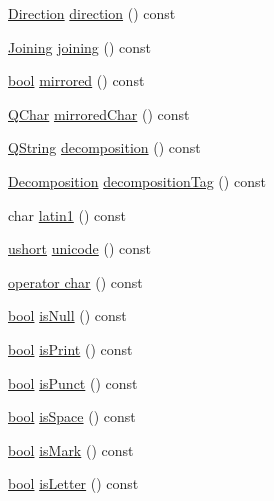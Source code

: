 \begin{DoxyCompactItemize}
\item 
\hyperlink{class_q_char_a54978126be7630b3e85394325a822302}{Direction} \hyperlink{class_q_char_a19463f6223338af13ffb5ec8231d0bed}{direction} () const 
\item 
\hyperlink{class_q_char_a086edd55a90ad2cf910ca3ab5fbe7bde}{Joining} \hyperlink{class_q_char_a8e2f3e25a839b13c9fe80cd3aa680273}{joining} () const 
\item 
\hyperlink{qglobal_8h_a1062901a7428fdd9c7f180f5e01ea056}{bool} \hyperlink{class_q_char_a1d8c62f3c5a7fdbc0fbd2446f2c4f14b}{mirrored} () const 
\item 
\hyperlink{class_q_char}{Q\+Char} \hyperlink{class_q_char_aa09f213821d383228dd0cd493e9fdc47}{mirrored\+Char} () const 
\item 
\hyperlink{class_q_string}{Q\+String} \hyperlink{class_q_char_a275c2ad60e7096c7528c21569a033c2b}{decomposition} () const 
\item 
\hyperlink{class_q_char_a13be45046e82a6d2991cef0b7c18d522}{Decomposition} \hyperlink{class_q_char_a67061033f813f4ae8f4565933fdc7e82}{decomposition\+Tag} () const 
\item 
char \hyperlink{class_q_char_a7e3aa161f0abd6fae0ecdbe18695b597}{latin1} () const 
\item 
\hyperlink{qglobal_8h_ab95f123a6c9bcfee6a343170ef8c5f69}{ushort} \hyperlink{class_q_char_afccd5f47b4b43fc6d96272f2f4b0db28}{unicode} () const 
\item 
\hyperlink{class_q_char_a18f1cb564b4da78e6f0bd77eb0c92576}{operator char} () const 
\item 
\hyperlink{qglobal_8h_a1062901a7428fdd9c7f180f5e01ea056}{bool} \hyperlink{class_q_char_acd16eba8ea394012940d462760ad988c}{is\+Null} () const 
\item 
\hyperlink{qglobal_8h_a1062901a7428fdd9c7f180f5e01ea056}{bool} \hyperlink{class_q_char_a094ebe62238eeb66afaaf0e0a5356f73}{is\+Print} () const 
\item 
\hyperlink{qglobal_8h_a1062901a7428fdd9c7f180f5e01ea056}{bool} \hyperlink{class_q_char_abb93276505d07b4850c718c3e143ab9b}{is\+Punct} () const 
\item 
\hyperlink{qglobal_8h_a1062901a7428fdd9c7f180f5e01ea056}{bool} \hyperlink{class_q_char_a43d041edb30115d7b7fa4e55a7fb7170}{is\+Space} () const 
\item 
\hyperlink{qglobal_8h_a1062901a7428fdd9c7f180f5e01ea056}{bool} \hyperlink{class_q_char_ac280e59d39696123476367042dc9873c}{is\+Mark} () const 
\item 
\hyperlink{qglobal_8h_a1062901a7428fdd9c7f180f5e01ea056}{bool} \hyperlink{class_q_char_a273cf470c206b9f4f1a419742b59b134}{is\+Letter} () const 

\end{DoxyCompactItemize}

